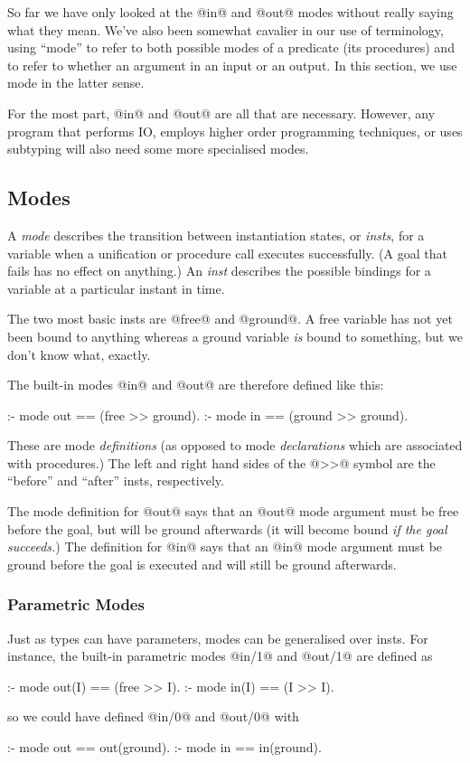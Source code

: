 So far we have only looked at the @in@ and @out@ modes without
really saying what they mean.  We've also been somewhat cavalier in our
use of terminology, using ``mode'' to refer to both possible modes of a
predicate (its procedures) and to refer to whether an argument in an
input or an output.  In this section, we use mode in the latter sense.

For the most part, @in@ and @out@ are all that are necessary.  However,
any program that performs IO, employs higher order programming techniques,
or uses subtyping will also need some more specialised modes.

\subsection{Modes}

A \emph{mode} describes the transition between instantiation states, or
\emph{insts}, for a variable when a unification or procedure call 
executes successfully.  (A goal that fails has no effect on anything.)
An \emph{inst} describes the possible bindings for a variable
at a particular instant in time.

The two most basic insts are @free@ and @ground@.  A free variable has
not yet been bound to anything whereas a ground variable \emph{is}
bound to something, but we don't know what, exactly.

The built-in modes @in@ and @out@ are therefore defined like this:
\begin{myverbatim}
:- mode out == (free   >> ground).
:- mode in  == (ground >> ground).
\end{myverbatim}
These are mode \emph{definitions} (as opposed to mode \emph{declarations}
which are associated with procedures.)  The left and right hand sides of
the @>>@ symbol are the ``before'' and ``after'' insts, respectively.

The mode definition for @out@ says that an @out@ mode argument must be
free before the goal, but will be ground afterwards (\ie it will
become bound \emph{if the goal succeeds.})  The definition for @in@ says
that an @in@ mode argument must be ground before the goal is executed
and will still be ground afterwards.

\subsubsection{Parametric Modes}

Just as types can have parameters, modes can be generalised over insts.
For instance, the built-in parametric modes @in/1@ and @out/1@ are defined as
\begin{myverbatim}
:- mode out(I) == (free >> I).
:- mode in(I)  == (I    >> I).
\end{myverbatim}
so we could have defined @in/0@ and @out/0@ with
\begin{myverbatim}
:- mode out == out(ground).
:- mode in  == in(ground).
\end{myverbatim}

